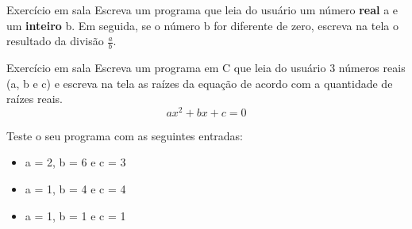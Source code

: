 \documentclass[portuguese,10pt,xcolor=table]{bredelebeamer}
\begin{document}
	\begin{frame}
	\begin{alertblock}{ Exercício em sala}
	Escreva um programa que leia do usuário um número \textbf{real} a e um \textbf{inteiro} b. Em seguida, se o número b for diferente de zero, escreva na tela o resultado da divisão $\frac{a}{b}$.

	\end{alertblock}
	\end{frame}

	\begin{frame}
	\begin{alertblock}{ Exercício em sala}
	Escreva um programa em C que leia do usuário 3 números reais (a, b e c) e escreva na tela as raízes da equação de acordo com a quantidade de raízes reais.
	$$ ax^2 + bx + c = 0$$

	Teste o seu programa com as seguintes entradas:
	\begin{itemize}
	\item a = 2, b = 6 e c = 3
	\item a = 1, b = 4 e c = 4
	\item a = 1, b = 1 e c = 1
	\end{itemize}
	\end{alertblock}
	\end{frame}


\end{document}
